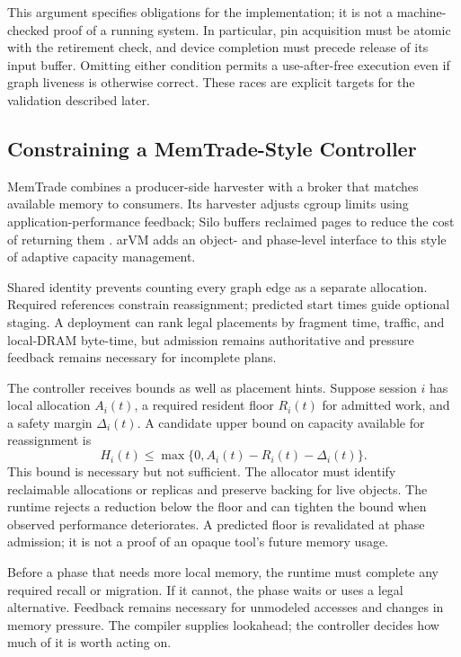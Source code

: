 \documentclass[letterpaper,twocolumn,10pt]{article}
\newcommand{\arvm}{arVM\xspace}
\newcommand{\memtrade}{MemTrade\xspace}
\begin{document}
This argument specifies obligations for the implementation; it is not a
machine-checked proof of a running system. In particular, pin acquisition must
be atomic with the retirement check, and device completion must precede
release of its input buffer. Omitting either condition permits a use-after-free
execution even if graph liveness is otherwise correct. These races are
explicit targets for the validation described later.

\subsection{Constraining a MemTrade-Style Controller}

\memtrade combines a producer-side harvester with a broker that matches
available memory to consumers. Its harvester adjusts cgroup limits using
application-performance feedback; Silo buffers reclaimed pages to reduce the
cost of returning them \cite{memtrade2021}. \arvm adds an object- and
phase-level interface to this style of adaptive capacity management.

Shared identity prevents counting every graph edge as a separate allocation.
Required references constrain reassignment; predicted start times guide
optional staging. A deployment can rank legal placements by fragment time,
traffic, and local-DRAM byte-time, but admission remains authoritative and
pressure feedback remains necessary for incomplete plans.

The controller receives bounds as well as placement hints. Suppose session
$i$ has local allocation $A_i(t)$, a required resident floor $R_i(t)$ for
admitted work, and a safety margin $\Delta_i(t)$. A candidate upper bound on
capacity available for reassignment is
\begin{equation}
  H_i(t) \leq \max\{0,A_i(t)-R_i(t)-\Delta_i(t)\}.
\end{equation}
This bound is necessary but not sufficient. The allocator must identify
reclaimable allocations or replicas and preserve backing for live objects.
The runtime rejects a reduction below the floor and can tighten the bound
when observed performance deteriorates. A predicted floor is revalidated at
phase admission; it is not a proof of an opaque tool's future memory usage.

Before a phase that needs more local memory, the runtime must complete any
required recall or migration. If it cannot, the phase waits or uses a legal
alternative. Feedback remains necessary for unmodeled accesses and changes
in memory pressure. The compiler supplies lookahead; the controller decides
how much of it is worth acting on.
\end{document}
